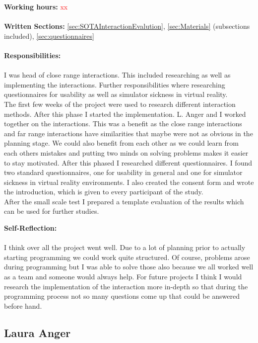 \textbf{Working hours:} \textcolor{red}{xx} \\ \\
\textbf{Written Sections:} \ref{sec:SOTAInteractionEvalution}, \ref{sec:Materials} (subsections included), \ref{sec:questionnaires} \\ \\
\textbf{Responsibilities:}\\ \\
I was head of close range interactions. This included researching as well as implementing the interactions. Further responsibilities where researching questionnaires for usability as well as simulator sickness in virtual reality. \\
The first few weeks of the project were used to research different interaction methods. After this phase I started the implementation. L. Anger and I worked together on the interactions. This was a benefit as the close range interactions and far range interactions have similarities that maybe were not as obvious in the planning stage. We could also benefit from each other as we could learn from each others mistakes and putting two minds on solving problems makes it easier to stay motivated. 
After this phased I researched different questionnaires. I found two standard questionnaires, one for usability in general and one for simulator sickness in virtual reality environments. I also created the consent form and wrote the introduction, which is given to every participant of the study. \\
After the small scale test I prepared a template evaluation of the results which can be used for further studies. 

\textbf{Self-Reflection:}\\ \\
I think over all the project went well. Due to a lot of planning prior to actually starting programming we could work quite structured. Of course, problems arose during programming but I was able to solve those also because we all worked well as a team and someone would always help. For future projects I think I would research the implementation of the interaction more in-depth so that during the programming process not so many questions come up that could be answered before hand.  \\
\newpage
\subsection{Laura Anger} \label{sec:SALaura}


